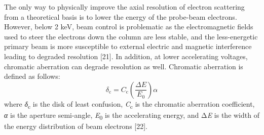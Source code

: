 \documentclass{article}
\begin{document}
The only way to physically improve the axial resolution of electron scattering from a theoretical basis is to lower the energy of the probe-beam electrons. However, below 2 keV, beam control is problematic as the electromagnetic fields used to steer the electrons down the column are less stable, and the less-energetic primary beam is more susceptible to external electric and magnetic interference leading to degraded resolution [21]. In addition, at lower accelerating voltages, chromatic aberration can degrade resolution as well. Chromatic aberration is defined as follows:
\begin{equation}
\delta_{\mathrm{c}} = C_{\mathrm{c}}\left(\frac{\Delta E}{E_0}\right)\alpha \tag{1}
\end{equation}
where \emph{δ}\textsubscript{c} is the disk of least confusion, \emph{C}\textsubscript{c} is the chromatic aberration coefficient, \emph{α} is the aperture semi-angle, \emph{E}\textsubscript{0} is the accelerating energy, and Δ\emph{E} is the width of the energy distribution of beam electrons [22].
\end{document}
